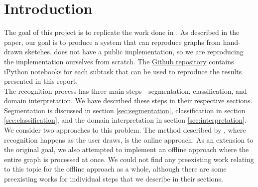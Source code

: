 \section{Introduction}

The goal of this project is to replicate the work done in \citeauthor{daly2015hand} \cite{daly2015hand}. As described in the paper, our goal is to produce a system that can reproduce graphs from hand-drawn sketches. \citeauthor{daly2015hand} does not have a public implementation, so we are reproducing the implementation ourselves from scratch. The \href{https://github.com/neerajgangwar/graph-recognition}{Github repository} contains iPython notebooks for each subtask that can be used to reproduce the results presented in this report.\\

The recognition process has three main steps - segmentation, classification, and domain interpretation. We have described these steps in their respective sections. Segmentation is discussed in section \ref{sec:segmentation}, classification in section \ref{sec:classification}, and the domain interpretation in section \ref{sec:interpretation}. \\

We consider two approaches to this problem. The method described by \citeauthor{daly2015hand}, where recognition happens as the user draws, is the online approach. As an extension to the original goal, we also attempted to implement an offline approach where the entire graph is processed at once. We could not find any preexisting work relating to this topic for the offline approach as a whole, although there are some preexisting works for individual steps that we describe in their sections.

